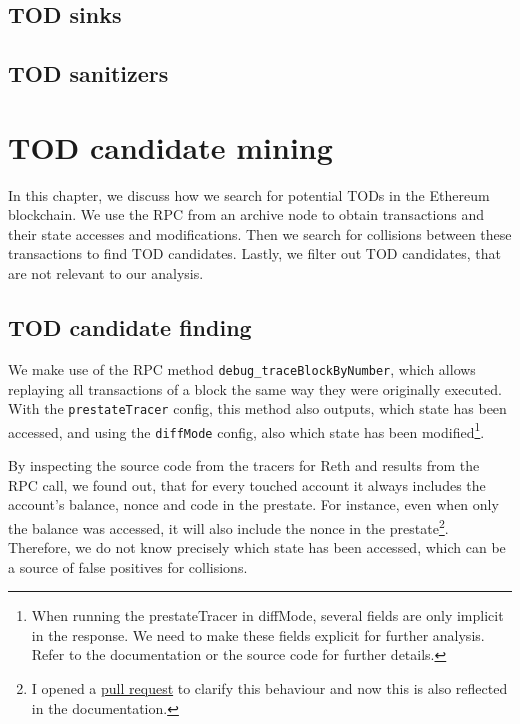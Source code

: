 \documentclass[draft,final]{vutinfth} %
\begin{document}
    \section{TOD sinks}

    \section{TOD sanitizers}

\fi
\chapter{TOD candidate mining}

In this chapter, we discuss how we search for potential TODs in the Ethereum blockchain. We use the RPC from an archive node to obtain transactions and their state accesses and modifications. Then we search for collisions between these transactions to find TOD candidates. Lastly, we filter out TOD candidates, that are not relevant to our analysis.

\section{TOD candidate finding}

We make use of the RPC method \verb|debug_traceBlockByNumber|, which allows replaying all transactions of a block the same way they were originally executed. With the \verb|prestateTracer| config, this method also outputs, which state has been accessed, and using the \verb|diffMode| config, also which state has been modified\footnote{When running the prestateTracer in diffMode, several fields are only implicit in the response. We need to make these fields explicit for further analysis. Refer to the documentation or the source code for further details.}.

By inspecting the source code from the tracers for Reth\cite{paradigm_revm-inspectors_2024} and results from the RPC call, we found out, that for every touched account it always includes the account's balance, nonce and code in the prestate. For instance, even when only the balance was accessed, it will also include the nonce in the prestate\footnote{I opened a \href{https://github.com/ethereum/go-ethereum/pull/30081}{pull request} to clarify this behaviour and now this is also reflected in the documentation\cite{noauthor_go-ethereum_2024-1}.}. Therefore, we do not know precisely which state has been accessed, which can be a source of false positives for collisions.
\end{document}
